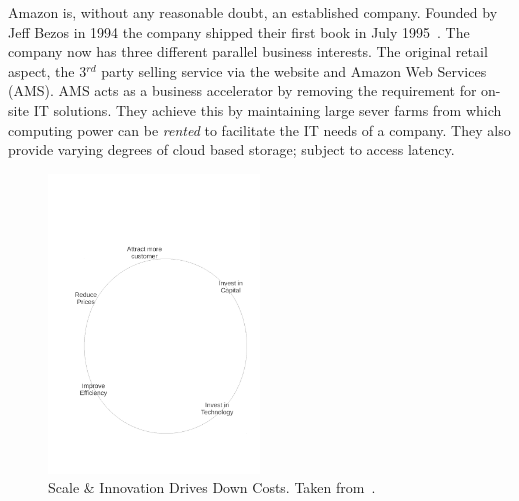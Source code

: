 {}

Amazon is, without any reasonable doubt, an established company.
Founded by Jeff Bezos in 1994 the company shipped their first book in July 1995~\cite{seattle}.
The company now has three different parallel business interests.
The original retail aspect, the 3$^{rd}$ party selling service via the website and Amazon Web Services (AMS).
AMS acts as a business accelerator by removing the requirement for on-site IT solutions.
They achieve this by maintaining large sever farms from which computing power can be \emph{rented} to facilitate the IT needs of a company.
They also provide varying degrees of cloud based storage; subject to access latency.




\begin{figure}
	\centering
	\includegraphics[width=0.5\textwidth]{./Figures/ScaleInnovation.pdf}
	\caption{Scale \& Innovation Drives Down Costs. Taken from~\cite{gavin2014ams}.}
	\label{fig:ScaleInnovation}
\end{figure}

